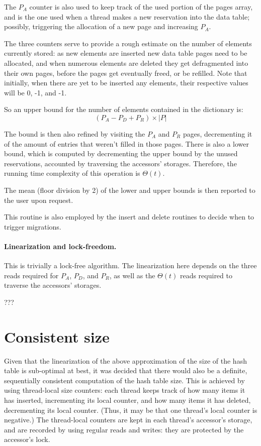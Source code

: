The $P_A$ counter is also used to keep track of the used portion of the pages array, and is the one used when a thread makes a new reservation into the data table; possibly, triggering the allocation of a new page and increasing $P_A$.

The three counters serve to provide a rough estimate on the number of elements currently stored: as new elements are inserted new data table pages need to be allocated, and when numerous elements are deleted they get defragmented into their own pages, before the pages get eventually freed, or be refilled.
Note that initially, when there are yet to be inserted any elements, their respective values will be 0, -1, and -1.

So an upper bound for the number of elements contained in the dictionary is:
\[
(P_A - P_D + P_R) \times |P|
\]

The bound is then also refined by visiting the $P_A$ and $P_R$ pages, decrementing it of the amount of entries that weren't filled in those pages.
There is also a lower bound, which is computed by decrementing the upper bound by the unused reservations, accounted by traversing the accessors' storages.
Therefore, the running time complexity of this operation is $\Theta(t)$.

The mean (floor division by 2) of the lower and upper bounds is then reported to the user upon request.

This routine is also employed by the insert and delete routines to decide when to trigger migrations.


\paragraph{Linearization and lock-freedom.}
This is trivially a lock-free algorithm.
The linearization here depends on the three reads required for $P_A$, $P_D$, and $P_R$, as well as the $\Theta(t)$ reads required to traverse the accessors' storages.

???

\section{Consistent size}\label{sec:consistent-size}

Given that the linearization of the above approximation of the size of the hash table is sub-optimal at best, it was decided that there would also be a definite, sequentially consistent computation of the hash table size.
This is achieved by using thread-local size counters: each thread keeps track of how many items it has inserted, incrementing its local counter, and how many items it has deleted, decrementing its local counter.
(Thus, it may be that one thread's local counter is negative.)
The thread-local counters are kept in each thread's accessor's storage, and are recorded by using regular reads and writes: they are protected by the accessor's lock.

